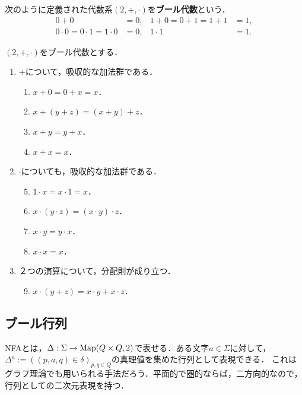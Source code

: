 \documentclass[uplatex, dvipdfmx]{jsreport}
\begin{document}
\begin{definition}
    次のように定義された代数系$(2,+,\cdot)$を\textbf{ブール代数}という．
    \begin{align*}
        0+0&=0,&1+0=0+1=1+1&=1,\\
        0\cdot 0=0\cdot 1=1\cdot 0&=0,&1\cdot 1&=1.
    \end{align*}
\end{definition}

\begin{proposition}
    $(2,+,\cdot)$をブール代数とする．
    \begin{enumerate}
    \item $+$について，吸収的な加法群である．
    \begin{enumerate}[(1)]
        \item $x+0=0+x=x$．
        \item $x+(y+z)=(x+y)+z$．
        \item $x+y=y+x$．
        \item $x+x=x$．
    \end{enumerate}
    \item $\cdot$についても，吸収的な加法群である．
    \begin{enumerate}[(1)]\setcounter{enumii}{4}
        \item $1\cdot x=x\cdot 1=x$．
        \item $x\cdot(y\cdot z)=(x\cdot y)\cdot z$．
        \item $x\cdot y=y\cdot x$．
        \item $x\cdot x=x$．
    \end{enumerate}
    \item ２つの演算について，分配則が成り立つ．
    \begin{enumerate}[(1)]\setcounter{enumii}{8}
        \item $x\cdot(y+z)=x\cdot y+x\cdot z$．
    \end{enumerate}
    \end{enumerate}
\end{proposition}

\subsection{ブール行列}

\begin{tcolorbox}[colframe=ForestGreen, colback=ForestGreen!10!white, breakable]
    NFAとは，$\Delta:\Sigma\to\mathrm{Map}(Q\times Q,2)$で表せる．ある文字$a\in\Sigma$に対して，$\Delta^a:=((p,a,q)\in\delta)_{p,q\in Q}$の真理値を集めた行列として表現できる．
    これはグラフ理論でも用いられる手法だろう．平面的で圏的ならば，二方向的なので，行列としての二次元表現を持つ．
\end{tcolorbox}
\end{document}
